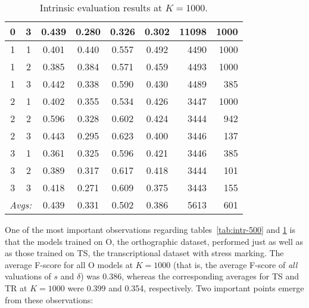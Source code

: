 \begin{table}[!h]
{\begin{tabular}{cc|ccccrr}
0 & 3 & 0.439 & 0.280 & 0.326 & 0.302 & 11098 & 1000 \\ \hline %
1 & 1 & 0.401 & 0.440 & 0.557 & 0.492 & 4490 & 1000 \\%
1 & 2 & 0.385 & 0.384 & 0.571 & 0.459 & 4493 & 1000 \\%
1 & 3 & 0.442 & 0.338 & 0.590 & 0.430 & 4489 & 385 \\ \hline %
2 & 1 & 0.402 & 0.355 & 0.534 & 0.426 & 3447 & 1000 \\%
2 & 2 & 0.596 & 0.328 & 0.602 & 0.424 & 3444 & 942 \\%
2 & 3 & 0.443 & 0.295 & 0.623 & 0.400 & 3446 & 137 \\ \hline %
3 & 1 & 0.361 & 0.325 & 0.596 & 0.421 & 3446 & 385 \\
3 & 2 & 0.389 & 0.317 & 0.617 & 0.418 & 3444 & 101 \\%
3 & 3 & 0.418 & 0.271 & 0.609 & 0.375 & 3443 & 155 \\ \hline \hline%
 \multicolumn{2}{r|}{\textit{Avgs:}} & 0.439 & 0.331 & 0.502 & 0.386 & 5613 & 601 \\
\end{tabular}
\label{subtab:intr-O-1000}
}
\caption{Intrinsic evaluation results at $K = 1000$. 
}
\label{tab:intr-1000}
\end{table}

One of the most important observations regarding tables~\ref{tab:intr-500} and \ref{tab:intr-1000}
 is that the models trained on O, the orthographic dataset, performed just as well as as those trained on TS, the transcriptional dataset
  with stress marking.
  The average F-score for all O 
 models at $K=1000$ (that is, the average F-score of \emph{all} valuations of $s$
   and $\delta$) was 0.386, whereas the corresponding averages for TS and TR at $K=1000$ were 0.399 and 0.354, respectively.
  Two important points emerge from these observations: 
  
